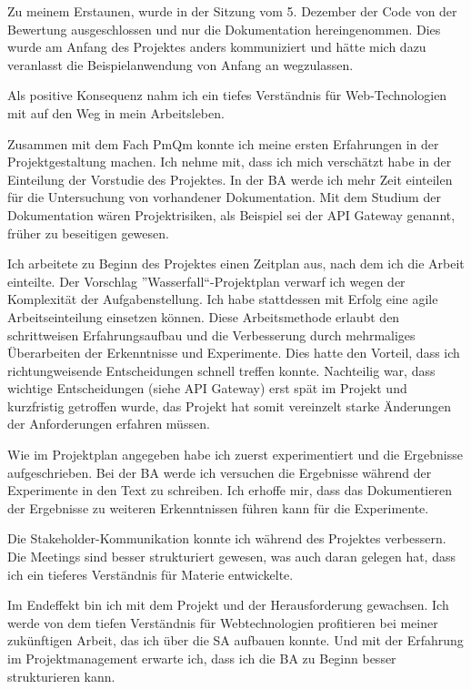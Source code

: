 Zu meinem Erstaunen, wurde in der Sitzung vom 5. Dezember der Code von der Bewertung ausgeschlossen und nur die Dokumentation hereingenommen. Dies wurde am Anfang des Projektes anders kommuniziert und hätte mich dazu veranlasst die Beispielanwendung von Anfang an wegzulassen.

Als  positive Konsequenz nahm ich ein tiefes Verständnis für Web-Technologien mit auf den Weg in mein Arbeitsleben. 

Zusammen mit dem Fach PmQm konnte ich meine ersten Erfahrungen in der Projektgestaltung machen. Ich nehme mit, dass ich mich verschätzt habe in der Einteilung der Vorstudie des Projektes. In der BA werde ich mehr Zeit einteilen für die Untersuchung von vorhandener Dokumentation. Mit dem Studium der Dokumentation wären Projektrisiken, als Beispiel sei der API Gateway genannt, früher zu beseitigen gewesen.

Ich arbeitete zu Beginn des Projektes einen Zeitplan aus, nach dem ich die Arbeit einteilte. Der Vorschlag ''Wasserfall``-Projektplan verwarf ich wegen der Komplexität der Aufgabenstellung. Ich habe stattdessen mit Erfolg eine agile Arbeitseinteilung einsetzen können. Diese Arbeitsmethode erlaubt den schrittweisen Erfahrungsaufbau und die Verbesserung durch mehrmaliges Überarbeiten der Erkenntnisse und Experimente. Dies hatte den Vorteil, dass ich richtungweisende Entscheidungen schnell treffen konnte. Nachteilig war, dass wichtige Entscheidungen (siehe API Gateway) erst spät im Projekt und kurzfristig getroffen wurde, das Projekt hat somit vereinzelt starke Änderungen der Anforderungen erfahren müssen.

Wie im Projektplan angegeben habe ich zuerst experimentiert und die Ergebnisse aufgeschrieben. Bei der BA werde ich versuchen die Ergebnisse während der Experimente in den Text zu schreiben. Ich erhoffe mir, dass das Dokumentieren der Ergebnisse zu weiteren Erkenntnissen führen kann für die Experimente.

Die Stakeholder-Kommunikation konnte ich während des Projektes verbessern. Die Meetings sind besser strukturiert gewesen, was auch daran gelegen hat, dass ich ein tieferes Verständnis für Materie entwickelte.

Im Endeffekt  bin ich mit dem Projekt und der Herausforderung gewachsen. Ich werde von dem tiefen Verständnis für Webtechnologien profitieren bei meiner zukünftigen Arbeit, das ich über die SA aufbauen konnte. Und mit der Erfahrung im Projektmanagement erwarte ich, dass ich die BA zu Beginn besser strukturieren kann.
